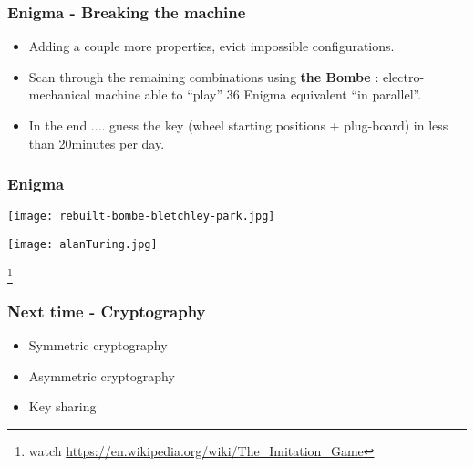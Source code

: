\documentclass[
hyperref={pdfpagelabels=false}
,xcolor=table
]
{beamer}
\begin{document}
\begin{frame}[fragile]
  \frametitle{Enigma - Breaking the machine}

  \begin{itemize}
  \item Adding a couple more properties, evict impossible configurations. 
  \item Scan through the remaining combinations using \textbf{the Bombe} : electro-mechanical machine able to ``play'' 36 Enigma equivalent ``in parallel''. 
  \item In the end .... guess the key (wheel starting positions + plug-board) in less than 20minutes per day. 
  \end{itemize}
 
\end{frame}



\begin{frame}
    \frametitle{Enigma}
  \begin{minipage}{0.45\textwidth}
    \texttt{[image: rebuilt-bombe-bletchley-park.jpg]}
  \end{minipage}
  \hfill
  \begin{minipage}{0.45\textwidth}
    \texttt{[image: alanTuring.jpg]}
  \end{minipage}

  \footnote*{watch \url{https://en.wikipedia.org/wiki/The_Imitation_Game}}
  
\end{frame}


\begin{frame}
  \frametitle{Next time - Cryptography}
  \begin{itemize}
  \item Symmetric cryptography
  \item Asymmetric cryptography
  \item Key sharing
  \end{itemize}
  
\end{frame}
\end{document}
